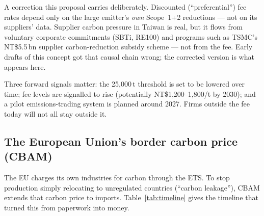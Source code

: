 \begin{keyfact}{A correction this proposal carries deliberately.}
Discounted (``preferential'') fee rates depend only on the large emitter's
\emph{own} Scope~1+2 reductions --- not on its suppliers'
data\cite{moenvfee,reset}. Supplier carbon pressure in Taiwan is real, but it
flows from voluntary corporate commitments (SBTi, RE100) and programs such as
TSMC's NT\$5.5\,bn supplier carbon-reduction subsidy scheme\cite{tsmc} --- not
from the fee. Early drafts of this concept got that causal chain wrong; the
corrected version is what appears here.
\end{keyfact}

Three forward signals matter: the 25,000\,t threshold is set to be lowered over
time; fee levels are signalled to rise (potentially NT\$1,200--1,800/t by
2030); and a pilot emissions-trading system is planned around
2027\cite{ecobiz}. Firms outside the fee today will not all stay outside it.

\subsection{The European Union's border carbon price (CBAM)}\label{sec:cbam}

The EU charges its own industries for carbon through the ETS. To stop
production simply relocating to unregulated countries (``carbon leakage''),
CBAM extends that carbon price to imports. Table~\ref{tab:timeline} gives the
timeline that turned this from paperwork into money.

